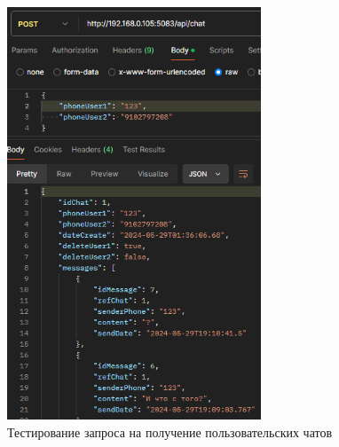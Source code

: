 \begin{figure}[H]
	\centering
	\includegraphics[width=0.8\linewidth]{images/test9}
	\caption{Тестирование запроса на получение пользовательских чатов}
	\label{fig:test9}
\end{figure}

